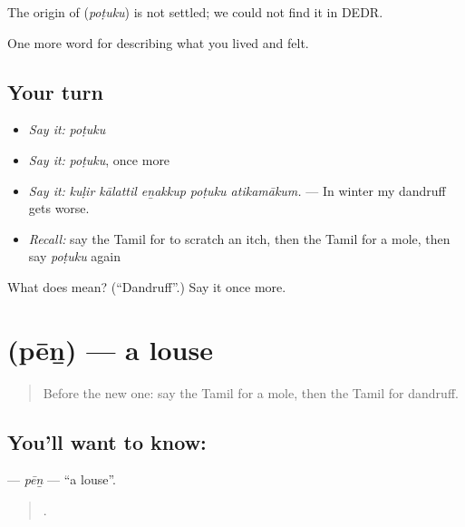 \begin{cousinweb}
The origin of \textbf{} (\emph{poṭuku}) is not settled; we could not find it in DEDR.
\end{cousinweb}

\begin{grammarlens}[title={What you've built}]
One more word for describing what you lived and felt.
\end{grammarlens}

\subsection*{Your turn}
\begin{itemize}
\raggedright
  \item \emph{Say it:} \emph{poṭuku}
  \item \emph{Say it:} \emph{poṭuku}, once more
  \item \emph{Say it:} \emph{kuḷir kālattil eṉakkup poṭuku atikamākum.} — In winter my dandruff gets worse.
  \item \emph{Recall:} say the Tamil for to scratch an itch, then the Tamil for a mole, then say \emph{poṭuku} again
\end{itemize}

\begin{tcolorbox}[breakable,colback=teal!4,colframe=teal!35!black,title={Before you move on}]
What does  mean? (\textquotedblleft{}Dandruff\textquotedblright{}.) Say it once more.
\end{tcolorbox}
\section[\texorpdfstring{\ta{பேன்} (pēṉ)}{பேன் (pēṉ)}]{ (pēṉ) — a louse}

\label{lesson:TA-C484-pen}



\begin{quote}
Before the new one: say the Tamil for a mole, then the Tamil for dandruff.
\end{quote}

\subsection*{You'll want to know: }
\textbf{} — \emph{pēṉ} — \textquotedblleft{}a louse\textquotedblright{}.

\begin{quote}
     .
\end{quote}

